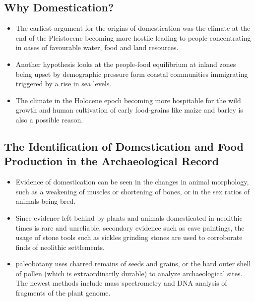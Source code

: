 \subsection{Why Domestication?}
\begin{itemize}
    \item The earliest argument for the origins of domestication was the climate at the end of the Pleistocene becoming more hostile leading to people concentrating in oases of favourable water, food and land resources.
    \item Another hypothesis looks at the people-food equilibrium at inland zones being upset by demographic pressure form coastal communities immigrating triggered by a rise in sea levels.
    \item The climate in the Holocene epoch becoming more hospitable for the wild growth and human cultivation of early food-grains like maize and barley is also a possible reason.
\end{itemize}

\subsection{The Identification of Domestication and Food Production in the Archaeological Record}
\begin{itemize}
    \item Evidence of domestication can be seen in the changes in animal \gls{morphology}, such as a weakening of muscles or shortening of bones, or in the sex ratios of animals being bred.
    \item Since evidence left behind by plants and animals domesticated in neolithic times is rare and unreliable, secondary evidence such as cave paintings, the usage of stone tools such as sickles grinding stones are used to corroborate finds of neolithic settlements.
    \item \Gls{paleobotany} uses charred remains of seeds and grains, or the hard outer shell of pollen (which is extraordinarily durable) to analyze archaeological sites. The newest methods include mass spectrometry and DNA analysis of fragments of the plant genome.
\end{itemize}

